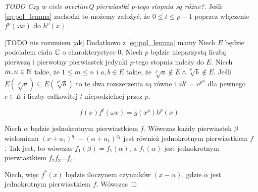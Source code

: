 \begin{proof}
  [TODO Czy w ciele overlineQ pierwiastki p-tego stopnia są różne?]

  Jeśli \ref{eq:pol_lemma} zachodzi to możemy założyć, że $0 \leq t \leq p - 1$
  poprzez włączenie $f^p(\omega x)$ do $h^p(x)$. 

  [TODO nie rozumiem jak] Dodatkowo z \ref{eq:pol_lemma} mamy
  Niech $E$ będzie podciałem ciała $\mathbb{C}$ o charakterystyce $0$. Niech $p$ będzie
  nieparzystą liczbą pierwszą i pierwotny pierwiastek jedynki $p$-tego stopnia
  należy do $E$. Niech $m, n \in \mathbb{N}$ takie, że $1 \leq m \leq n$ i $a, b \in E$
  takie, że $\sqrt[p]{a} \not \in E \land \sqrt[p]{b} \not \in E$.  Jeśli $E
  \left(\sqrt[p^m]{a}\right)  \subseteq E\left(\sqrt[p^n]{b}\right)$ to te dwa
  rozszerzenia są równe i $ab^t = c^{p^m}$ dla pewnego $c \in E$ i liczby
  całkowitej $t$ niepodzielnej przez $p$.
  \label{lem:associated_extensions}

  \begin{equation}
    f(x)f^t(\omega x) = g\left(x^p\right)h^p(x)
    \label{eq:pol_lemma_right}
  \end{equation}

  Niech $\alpha$ będzie jednokrotnym pierwiastkiem $f$. Wówczas każdy
  pierwiastek $\beta$ wielomianu $\left(x + a_1\right)^{q_1} - \left(\alpha +
  a_1\right)^{q_1}$ jest również jednokrotnym pierwiastkiem $f$. Tak jest, bo
  wówczas $f_1(\beta) = f_1(\alpha)$, a $f_1(\alpha)$ jest jednokrotnym
  pierwiastkiem $f_2f_3 \ldots f_{l}$.

  Niech, więc $f^*(x)$ będzie iloczynem czynników $(x-\alpha)$, gdzie $\alpha$
  jest jednokrotnym pierwiastkiem $f$. Wówczas
\end{proof}

